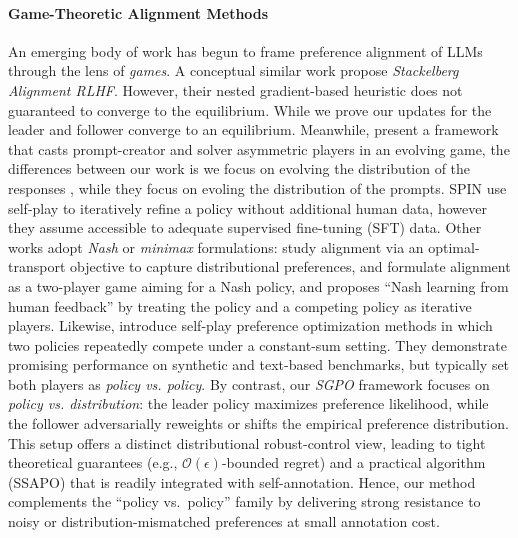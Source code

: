 \vspace{-0.15 in}
\paragraph{Game-Theoretic Alignment Methods}
An emerging body of work has begun to frame preference alignment of LLMs 
through the lens of \emph{games}. A conceptual similar work \citep{Makar2024Sta} propose \emph{Stackelberg Alignment RLHF}. However, their nested gradient-based heuristic does not guaranteed to converge to the equilibrium. While we prove our updates for the leader and follower converge to an equilibrium.
Meanwhile, \citet{Ye2024Evolving} present a framework that casts prompt-creator and solver asymmetric players in an evolving game, the differences between our work is we focus on evolving the distribution of the  responses , while they focus on evoling the distribution of the prompts. SPIN \citep{Chen2024SelfPlay} use self-play to iteratively refine 
a policy without additional human data, however they assume accessible to adequate supervised fine-tuning (SFT) data. 
Other works adopt \emph{Nash} or \emph{minimax} formulations:
\citet{Melnyk2024Distributional} study alignment via an optimal-transport objective to capture distributional preferences, 
\citet{Zhang2024Iterative} and \citet{Rosset2024Direct} formulate alignment as a two-player game aiming for a Nash policy, 
and \citet{Munos2024Nash} proposes “Nash learning from human feedback” 
by treating the policy and a competing policy as iterative players.
Likewise, \citet{Swamy2024Minimaximalist,Wu2024Self} introduce self-play preference optimization methods 
in which two policies repeatedly compete under a constant-sum setting. 
They demonstrate promising performance on synthetic and text-based benchmarks, but typically set both players as \emph{policy vs. policy}. By contrast, our \emph{SGPO} framework focuses on \emph{policy vs. distribution}:  the leader policy maximizes preference likelihood, while the follower adversarially reweights or shifts the empirical preference distribution. This setup offers a distinct distributional robust-control view, leading to tight theoretical guarantees (e.g., $\mathcal{O}(\epsilon)$-bounded regret) and a practical algorithm (SSAPO) that is readily integrated with self-annotation. Hence, our method complements the “policy vs.\ policy” family by delivering strong resistance to noisy or distribution-mismatched preferences at small annotation cost.